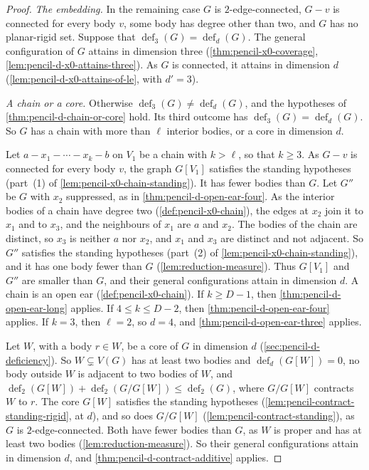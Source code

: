\begin{proof}
  \emph{The embedding.} In the remaining case $G$ is
  $2$-edge-connected, $G - v$ is connected for every body $v$, some body
  has degree other than two, and $G$ has no planar-rigid set. Suppose
  that $\operatorname{def}_3(G) = \operatorname{def}_d(G)$. The general
  configuration of $G$ attains in dimension three
  (\cref{thm:pencil-x0-coverage}, \cref{lem:pencil-d-x0-attains-three}).
  As $G$ is connected, it attains in dimension $d$
  (\cref{lem:pencil-d-x0-attains-of-le}, with $d' = 3$).

  \emph{A chain or a core.} Otherwise
  $\operatorname{def}_3(G) \neq \operatorname{def}_d(G)$, and the
  hypotheses of \cref{thm:pencil-d-chain-or-core} hold. Its third
  outcome has $\operatorname{def}_3(G) = \operatorname{def}_d(G)$. So
  $G$ has a chain with more than $\ell$ interior bodies, or a core in
  dimension $d$.

  Let $a - x_1 - \cdots - x_k - b$ on $V_1$ be a chain with $k > \ell$,
  so that $k \ge 3$. As $G - v$ is connected for every body $v$, the
  graph $G[V_1]$ satisfies the standing hypotheses (part~(1) of
  \cref{lem:pencil-x0-chain-standing}). It has fewer bodies than $G$.
  Let $G''$ be $G$ with $x_2$ suppressed, as in
  \cref{thm:pencil-d-open-ear-four}. As the interior bodies of a chain
  have degree two (\cref{def:pencil-x0-chain}), the edges at $x_2$ join
  it to $x_1$ and to $x_3$, and the neighbours of $x_1$ are $a$ and
  $x_2$. The bodies of the chain are distinct, so $x_3$ is neither $a$
  nor $x_2$, and $x_1$ and $x_3$ are distinct and not adjacent. So $G''$
  satisfies the standing hypotheses (part~(2) of
  \cref{lem:pencil-x0-chain-standing}), and it has one body fewer than
  $G$ (\cref{lem:reduction-measure}). Thus $G[V_1]$ and $G''$ are
  smaller than $G$, and their general configurations attain in dimension
  $d$. A chain is an open ear (\cref{def:pencil-x0-chain}). If
  $k \ge D - 1$, then \cref{thm:pencil-d-open-ear-long} applies. If
  $4 \le k \le D - 2$, then \cref{thm:pencil-d-open-ear-four} applies.
  If $k = 3$, then $\ell = 2$, so $d = 4$, and
  \cref{thm:pencil-d-open-ear-three} applies.

  Let $W$, with a body $r \in W$, be a core of $G$ in dimension $d$
  (\cref{sec:pencil-d-deficiency}). So $W \subsetneq V(G)$ has at least
  two bodies and $\operatorname{def}_d(G[W]) = 0$, no body outside $W$
  is adjacent to two bodies of $W$, and
  $\operatorname{def}_2(G[W]) + \operatorname{def}_2(G/G[W]) \le
  \operatorname{def}_2(G)$, where $G/G[W]$ contracts $W$ to $r$. The
  core $G[W]$ satisfies the standing hypotheses
  (\cref{lem:pencil-contract-standing-rigid}, at $d$), and so does
  $G/G[W]$ (\cref{lem:pencil-contract-standing}), as $G$ is
  $2$-edge-connected. Both have fewer bodies than $G$, as $W$ is proper
  and has at least two bodies (\cref{lem:reduction-measure}). So their
  general configurations attain in dimension $d$, and
  \cref{thm:pencil-d-contract-additive} applies.


\end{proof}
